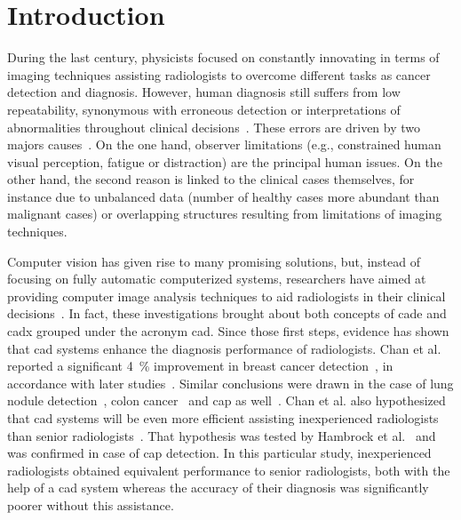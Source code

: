 \section{Introduction} \label{sec:introduction}

During the last century, physicists focused on constantly innovating in terms of imaging techniques assisting radiologists to overcome different tasks as cancer detection and diagnosis. However, human diagnosis still suffers from low repeatability, synonymous with erroneous detection or interpretations of abnormalities throughout clinical decisions~\cite{Giger2008,Hambrock2013}. These errors are driven by two majors causes~\cite{Giger2008}. On the one hand, observer limitations (e.g., constrained human visual perception, fatigue or distraction) are the principal human issues. On the other hand, the second reason is linked to the clinical cases themselves, for instance due to unbalanced data (number of healthy cases more abundant than malignant cases) or overlapping structures resulting from limitations of imaging techniques.

Computer vision has given rise to many promising solutions, but, instead of focusing on fully automatic computerized systems, researchers have aimed at providing computer image analysis techniques to aid radiologists in their clinical decisions~\cite{Giger2008}. In fact, these investigations brought about both concepts of \ac{cade} and \ac{cadx} grouped under the acronym \acs{cad}. Since those first steps, evidence has shown that \acs{cad} systems enhance the diagnosis performance of radiologists. Chan et al. reported a significant 4~\% improvement in breast cancer detection~\cite{Chan1999}, in accordance with later studies~\cite{Dean2006}. Similar conclusions were drawn in the case of lung nodule detection~\cite{Li2004}, colon cancer~\cite{Petrick2008} and \ac{cap} as well~\cite{Hambrock2013}. Chan et al. also hypothesized that \acs{cad} systems will be even more efficient assisting inexperienced radiologists than senior radiologists~\cite{Chan1999}. That hypothesis was tested by Hambrock et al.~\cite{Hambrock2013} and was confirmed in case of \ac{cap} detection. In this particular study, inexperienced radiologists obtained equivalent performance to senior radiologists, both with the help of a \acs{cad} system whereas the accuracy of their diagnosis was significantly poorer without this assistance.

